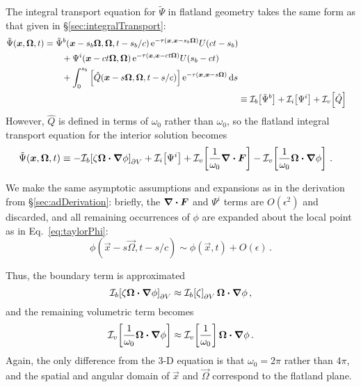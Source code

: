 The integral transport equation for $\tilde\Psi$ in flatland geometry takes the
same form as that given in \S\ref{sec:integralTransport}:
\begin{align*}
\begin{split}
  \tilde\Psi(\bm{x}, \bm{\Omega}, t)
  &=
  \tilde\Psi^b(\bm{x} - s_b\bm{\Omega}, \bm{\Omega}, t - s_b/c)
  \mathop{}\!\mathrm{e}^{ -\tau(\bm{x}, \bm{x} - s_b \bm{\Omega})}
  U(ct - s_b)
  \\
  &\qquad + \Psi^i( \bm{x} - ct \bm{\Omega}, \bm{\Omega})
  \mathop{}\!\mathrm{e}^{ -\tau(\bm{x}, \bm{x} - ct \bm{\Omega})}
  U( s_b - ct)
  \\
  &\qquad + \int_{0}^{s_b}
  \left[ \hat Q(\bm{x} - s \bm{\Omega}, \bm{\Omega}, t-s/c)
  \right]
  \mathop{}\!\mathrm{e}^{ -\tau(\bm{x}, \bm{x} - s \bm{\Omega})}
  \mathop{}\!\mathrm{d} s
\end{split}
  \\
    &\equiv \mathcal{I}_{b}\!\left[\tilde\Psi^b\right]
    + \mathcal{I}_{i}\!\left[\Psi^i\right]
    + \mathcal{I}_{v}\!\left[\hat Q\right]
\end{align*}
However, $\hat Q$ is defined in terms of $\omega_0$ rather than $\omega_0$, so the
flatland integral transport equation for the interior solution becomes
\begin{align} \label{eq:flatinverseTransportBrief}
    \tilde\Psi(\bm{x}, \bm{\Omega}, t)
    &\equiv
    -\mathcal{I}_{b}\!\left[\zeta \bm{\Omega}\bm{\cdot} \bm{\nabla} \phi\right]_{\partial V}
    + \mathcal{I}_{i}\!\left[\Psi^i\right]
    + \mathcal{I}_{v}\!\left[\frac{1}{\omega_0} \bm{\nabla} \bm{\cdot}\bm{F} \right]
    - \mathcal{I}_{v}\!\left[\frac{1}{\omega_0} \bm{\Omega}\bm{\cdot} \bm{\nabla} \phi\right]
    \,.
\end{align}

We make the same asymptotic assumptions and expansions as in the derivation from
\S\ref{sec:adDerivation}: briefly, the $\bm{\nabla} \bm{\cdot}\bm{F}$ and $\Psi^i$ terms are
$O(\epsilon^2)$ and discarded, and all remaining occurrences of $\phi$ are
expanded about the local point as in Eq.~\eqref{eq:taylorPhi}:
\begin{equation*}
  \phi(\vec{x} - s \vec{\Omega}, t-s/c)
  \sim \phi(\vec{x},t) + O(\epsilon) \,.
\end{equation*}

Thus, the boundary term is approximated 
\begin{equation*}
  \mathcal{I}_{b}\!\left[\zeta \bm{\Omega}\bm{\cdot} \bm{\nabla} \phi\right]_{\partial V}
  \approx \mathcal{I}_{b}\!\left[\zeta\right]_{\partial V}  \bm{\Omega}\bm{\cdot} \bm{\nabla} \phi \,,
\end{equation*}
and the remaining volumetric term becomes
\begin{equation*}
  \mathcal{I}_{v}\!\left[\frac{1}{\omega_0} \bm{\Omega}\bm{\cdot} \bm{\nabla} \phi\right]
  \approx \mathcal{I}_{v}\!\left[\frac{1}{\omega_0}\right] \bm{\Omega}\bm{\cdot} \bm{\nabla} \phi \,.
\end{equation*}
Again, the only difference from the 3-D equation is that $\omega_0=2\pi$ rather
than $4\pi$, and the spatial and angular domain of $\vec{x}$ and $\vec{\Omega}$
correspond to the flatland plane.

